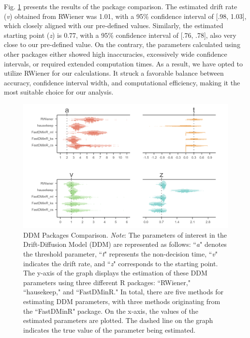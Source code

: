 \documentclass[sn-apa]{sn-jnl}%
\theoremstyle{thmstyleone}%
\theoremstyle{thmstyletwo}%
\theoremstyle{thmstylethree}%
\begin{document}
Fig. \ref{fig:DDM_comparision} presents the results of the package comparison. The estimated drift rate (\textit{v}) obtained from RWiener was 1.01, with a 95\% confidence interval of [.98, 1.03], which closely aligned with our pre-defined values. Similarly, the estimated starting point (\textit{z}) is 0.77, with a 95\% confidence interval of [.76, .78], also very close to our pre-defined value. On the contrary, the parameters calculated using other packages either showed high inaccuracies, excessively wide confidence intervals, or required extended computation times. As a result, we have opted to utilize RWiener for our calculations. It struck a favorable balance between accuracy, confidence interval width, and computational efficiency, making it the most suitable choice for our analysis.
\clearpage

\begin{figure}[!ht]
	\centering
	\includegraphics[width=1\textwidth]{./Figure/Fig2_DDM_comparision.png}
	\caption[DDM Packages Comparison]{DDM Packages Comparison. \textit{Note}: The parameters of interest in the Drift-Diffusion Model (DDM) are represented as follows: ``\textit{a}" denotes the threshold parameter, ``\textit{t}" represents the non-decision time, ``\textit{v}" indicates the drift rate, and ``\textit{z}" corresponds to the starting point. The y-axis of the graph displays the estimation of these DDM parameters using three different R packages: ``RWiener," ``hausekeep," and ``FastDMinR." In total, there are five methods for estimating DDM parameters, with three methods originating from the ``FastDMinR" package. On the x-axis, the values of the estimated parameters are plotted. The dashed line on the graph indicates the true value of the parameter being estimated.
	}\label{fig:DDM_comparision}
\end{figure}
\end{document}
